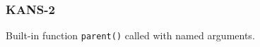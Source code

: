 \subsubsection{KANS-2}\label{sec:error_code_kans_2}

Built-in function \texttt{parent()} called with named arguments.


